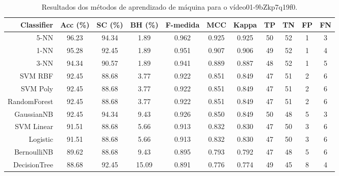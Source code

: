 \begin{table}[!htb]
\centering
\caption{Resultados dos métodos de aprendizado de máquina para o vídeo01-9bZkp7q19f0.}
\label{tab:01-9bZkp7q19f0}
\begin{tabular}{r|c|c|c|c|c|c|c|c|c|c}
\hline\hline
Classifier & Acc (\%) & SC (\%) & BH (\%) & F-medida & MCC & Kappa & TP & TN & FP & FN \\ \hline
5-NN & 96.23 & 94.34 & 1.89 & 0.962 & 0.925 & 0.925 & 50 & 52 & 1 & 3 \\ 
1-NN & 95.28 & 92.45 & 1.89 & 0.951 & 0.907 & 0.906 & 49 & 52 & 1 & 4 \\ 
3-NN & 94.34 & 90.57 & 1.89 & 0.941 & 0.889 & 0.887 & 48 & 52 & 1 & 5 \\ 
SVM RBF & 92.45 & 88.68 & 3.77 & 0.922 & 0.851 & 0.849 & 47 & 51 & 2 & 6 \\ 
SVM Poly & 92.45 & 88.68 & 3.77 & 0.922 & 0.851 & 0.849 & 47 & 51 & 2 & 6 \\ 
RandomForest & 92.45 & 88.68 & 3.77 & 0.922 & 0.851 & 0.849 & 47 & 51 & 2 & 6 \\ 
GaussianNB & 92.45 & 94.34 & 9.43 & 0.926 & 0.850 & 0.849 & 50 & 48 & 5 & 3 \\ 
SVM Linear & 91.51 & 88.68 & 5.66 & 0.913 & 0.832 & 0.830 & 47 & 50 & 3 & 6 \\ 
Logistic & 91.51 & 88.68 & 5.66 & 0.913 & 0.832 & 0.830 & 47 & 50 & 3 & 6 \\ 
BernoulliNB & 89.62 & 88.68 & 9.43 & 0.895 & 0.793 & 0.792 & 47 & 48 & 5 & 6 \\ 
DecisionTree & 88.68 & 92.45 & 15.09 & 0.891 & 0.776 & 0.774 & 49 & 45 & 8 & 4 \\ 
\hline\hline
\end{tabular}
\end{table}
